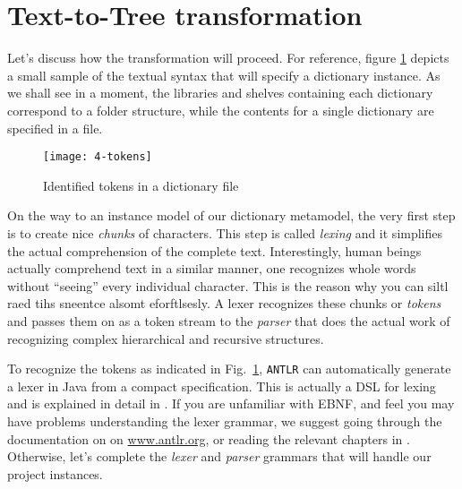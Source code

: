 \newpage
\section{Text-to-Tree transformation}
\genHeader

Let's discuss how the transformation will proceed. For reference, figure \ref{fig:moca-4-Tokens} depicts a small sample of the textual syntax that will specify
a dictionary instance. As we shall see in a moment, the libraries and shelves containing each dictionary correspond to a folder structure, while the
contents for a single dictionary are specified in a file.

\begin{figure}[!htbp]
\begin{center}
 \texttt{[image: 4-tokens]}
  \caption{Identified tokens in a dictionary file}
  \label{fig:moca-4-Tokens}
\end{center}
\end{figure}

On the way to an instance model of our dictionary metamodel, the very first step is to create nice \emph{chunks} of characters. This step is called
\emph{lexing} and it simplifies the actual comprehension of the complete text. Interestingly, human beings actually comprehend text in a similar manner, one
recognizes whole words without ``seeing'' every individual character. This is the reason why you can siltl raed tihs sneentce alsomt eforftlsesly. A lexer
recognizes these chunks or \emph{tokens} and passes them on as a token stream to the \emph{parser} that does the actual work of recognizing complex
hierarchical and recursive structures.
   
To recognize the tokens as indicated in Fig.~\ref{fig:moca-4-Tokens}, \texttt{ANTLR} can automatically generate a lexer in Java from a compact specification.
This is actually a DSL for lexing and is explained in detail in \cite{ANTLR}. If you are unfamiliar with EBNF, and feel you may have problems understanding
the lexer grammar, we suggest going through the documentation on on \url{www.antlr.org}, or reading the relevant chapters in \cite{ANTLR}. Otherwise, let's
complete the \emph{lexer} and \emph{parser} grammars that will handle our project instances.

